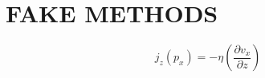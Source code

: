 \chapter{FAKE METHODS}\label{chap:Methods}

\begin{equation}
\label{eq:viscosity}
j_z(p_x) = -\eta \left(\frac{\partial v_x}{\partial z}\right)
\end{equation}